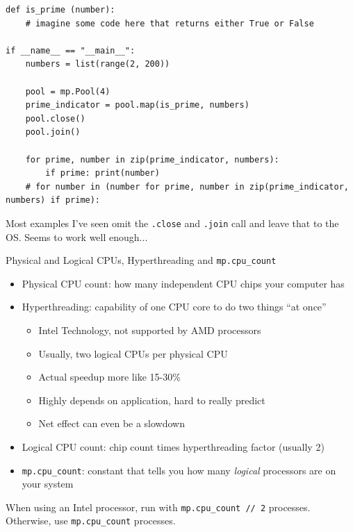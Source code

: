 \begin{frame}[fragile]
%
\begin{codebox}
\begin{verbatim}
def is_prime (number):
    # imagine some code here that returns either True or False

if __name__ == "__main__":
    numbers = list(range(2, 200))
    
    pool = mp.Pool(4)
    prime_indicator = pool.map(is_prime, numbers)
    pool.close()
    pool.join()
    
    for prime, number in zip(prime_indicator, numbers):
        if prime: print(number)
    # for number in (number for prime, number in zip(prime_indicator, numbers) if prime):
\end{verbatim}
\end{codebox}
%
\begin{hintbox}
\footnotesize
Most examples I've seen omit the \texttt{.close} and \texttt{.join} call and leave that to the OS. Seems to work well enough...
\end{hintbox}
%
\end{frame}


\begin{frame}{Physical and Logical CPUs, Hyperthreading and \texttt{mp.cpu\_count}}
%
\begin{itemize}
\item Physical CPU count: how many independent CPU chips your computer has
\item Hyperthreading: capability of one CPU core to do two things \enquote{at once} 
	\begin{itemize}
	\item Intel Technology, not supported by AMD processors
	\item Usually, two logical CPUs per physical CPU
	\item Actual speedup more like 15-30\%
	\item Highly depends on application, hard to really predict
	\item Net effect can even be a slowdown
	\end{itemize}
\item Logical CPU count: chip count times hyperthreading factor (usually 2)
\item \texttt{mp.cpu\_count}: constant that tells you how many \emph{logical} processors are on your system
\end{itemize}
%
\begin{hintbox}
When using an Intel processor, run with \texttt{mp.cpu\_count // 2} processes.\\
Otherwise, use \texttt{mp.cpu\_count} processes.
\end{hintbox}
%
\end{frame}

